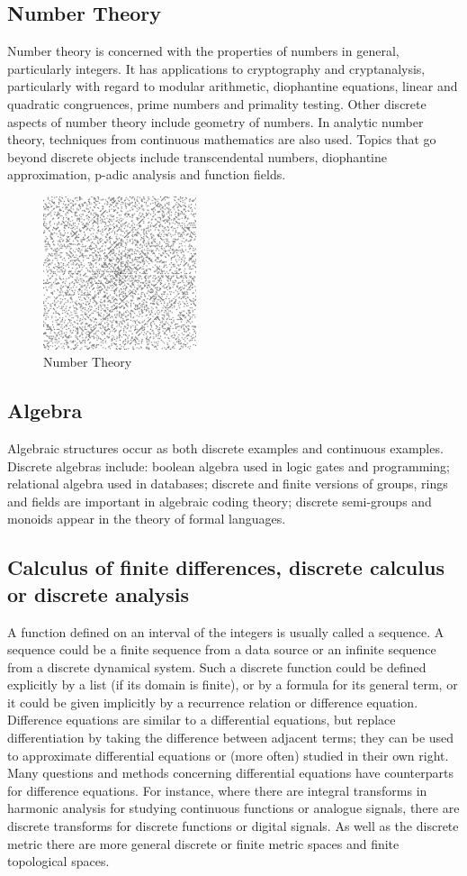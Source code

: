 \documentclass{article}
\begin{document}
\subsection{Number Theory}
Number theory is concerned with the properties of numbers in general, particularly integers. It has applications to cryptography and cryptanalysis, particularly with regard to modular arithmetic, diophantine equations, linear and quadratic congruences, prime numbers and primality testing. Other discrete aspects of number theory include geometry of numbers. In analytic number theory, techniques from continuous mathematics are also used. Topics that go beyond discrete objects include transcendental numbers, diophantine approximation, p-adic analysis and function fields.
\begin{figure}[h]
\includegraphics[width=0.4\textwidth]{sd.png}
\caption{Number Theory}
\end{figure}
\newpage
\subsection{Algebra}
Algebraic structures occur as both discrete examples and continuous examples. Discrete algebras include: boolean algebra used in logic gates and programming; relational algebra used in databases; discrete and finite versions of groups, rings and fields are important in algebraic coding theory; discrete semi-groups and monoids appear in the theory of formal languages. 
\subsection{Calculus of finite differences, discrete calculus or discrete analysis}
A function defined on an interval of the integers is usually called a sequence. A sequence could be a finite sequence from a data source or an infinite sequence from a discrete dynamical system. Such a discrete function could be defined explicitly by a list (if its domain is finite), or by a formula for its general term, or it could be given implicitly by a recurrence relation or difference equation. Difference equations are similar to a differential equations, but replace differentiation by taking the difference between adjacent terms; they can be used to approximate differential equations or (more often) studied in their own right. Many questions and methods concerning differential equations have counterparts for difference equations. For instance, where there are integral transforms in harmonic analysis for studying continuous functions or analogue signals, there are discrete transforms for discrete functions or digital signals. As well as the discrete metric there are more general discrete or finite metric spaces and finite topological spaces. 
\end{document}
